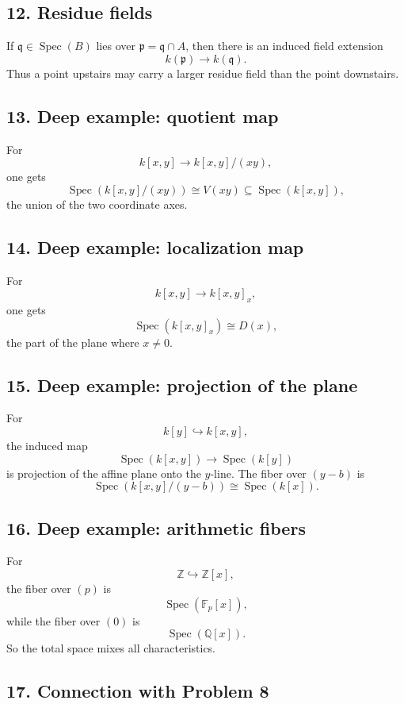 \documentclass[12pt,a4paper]{article}
\theoremstyle{plain}
\theoremstyle{definition}      %
\begin{document}
\subsection*{12. Residue fields}

If \(\mathfrak q\in\operatorname{Spec}(B)\) lies over \(\mathfrak p=\mathfrak q\cap A\), then there is an induced field extension
\[
k(\mathfrak p)\to k(\mathfrak q).
\]
Thus a point upstairs may carry a larger residue field than the point downstairs.

\subsection*{13. Deep example: quotient map}

For
\[
k[x,y]\to k[x,y]/(xy),
\]
one gets
\[
\operatorname{Spec}(k[x,y]/(xy))\cong V(xy)\subseteq \operatorname{Spec}(k[x,y]),
\]
the union of the two coordinate axes.

\subsection*{14. Deep example: localization map}

For
\[
k[x,y]\to k[x,y]_x,
\]
one gets
\[
\operatorname{Spec}(k[x,y]_x)\cong D(x),
\]
the part of the plane where \(x\neq 0\).

\subsection*{15. Deep example: projection of the plane}

For
\[
k[y]\hookrightarrow k[x,y],
\]
the induced map
\[
\operatorname{Spec}(k[x,y])\to \operatorname{Spec}(k[y])
\]
is projection of the affine plane onto the \(y\)-line. The fiber over \((y-b)\) is
\[
\operatorname{Spec}(k[x,y]/(y-b))
\cong
\operatorname{Spec}(k[x]).
\]

\subsection*{16. Deep example: arithmetic fibers}

For
\[
\mathbb Z\hookrightarrow \mathbb Z[x],
\]
the fiber over \((p)\) is
\[
\operatorname{Spec}(\mathbb F_p[x]),
\]
while the fiber over \((0)\) is
\[
\operatorname{Spec}(\mathbb Q[x]).
\]
So the total space mixes all characteristics.

\subsection*{17. Connection with Problem 8}
\end{document}
